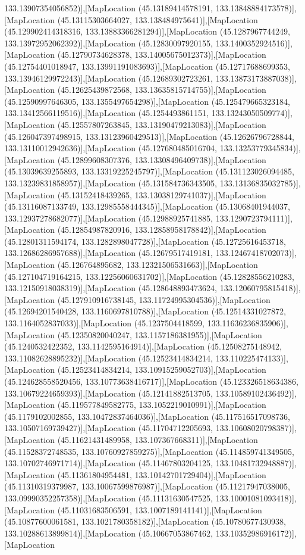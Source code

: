 133.13907354056852)],[MapLocation (45.13189414578191, 133.13848884173578)],[MapLocation (45.13115303664027, 133.138484975641)],[MapLocation (45.129902414318316, 133.13883366281294)],[MapLocation (45.1287967744249, 133.13972952062392)],[MapLocation (45.12830097920155, 133.1400352924516)],[MapLocation (45.12790734628378, 133.14005675012373)],[MapLocation (45.12754401018947, 133.13991191083693)],[MapLocation (45.12717688699353, 133.13946129972243)],[MapLocation (45.12689302723261, 133.13873173887038)],[MapLocation (45.12625439872568, 133.13635815714755)],[MapLocation (45.12590997646305, 133.1355497654298)],[MapLocation (45.125479665323184, 133.13412566119516)],[MapLocation (45.1254493861151, 133.13243050509774)],[MapLocation (45.12557807263845, 133.13190479213083)],[MapLocation (45.126047397498915, 133.13123960429513)],[MapLocation (45.12626796728844, 133.13110012942636)],[MapLocation (45.127680485016704, 133.13253779345834)],[MapLocation (45.12899608307376, 133.13308496409738)],[MapLocation (45.13039639255893, 133.13319225245797)],[MapLocation (45.131123026094485, 133.13239831858957)],[MapLocation (45.131584736343505, 133.13136835032785)],[MapLocation (45.13152418439265, 133.13038129741037)],[MapLocation (45.13116087133749, 133.12985558444345)],[MapLocation (45.13068401944037, 133.12937278682077)],[MapLocation (45.12988925741885, 133.1290723794111)],[MapLocation (45.12854987820916, 133.12858958178842)],[MapLocation (45.12801311594174, 133.1282898047728)],[MapLocation (45.12725616453718, 133.12686286957688)],[MapLocation (45.12679517419181, 133.12467418702073)],[MapLocation (45.126764895682, 133.12321506531663)],[MapLocation (45.127104719164215, 133.12256060631702)],[MapLocation (45.12828556210283, 133.12150918038319)],[MapLocation (45.128648893473624, 133.12060795815418)],[MapLocation (45.127910916738145, 133.11724995304536)],[MapLocation (45.12694201540428, 133.1160697810788)],[MapLocation (45.12514331027872, 133.1164052837033)],[MapLocation (45.1237504418599, 133.11636236835906)],[MapLocation (45.12350820040247, 133.1157186381955)],[MapLocation (45.1240532422352, 133.1142595164914)],[MapLocation (45.12508275148942, 133.11082628895232)],[MapLocation (45.12523414834214, 133.110225474133)],[MapLocation (45.12523414834214, 133.10915259052703)],[MapLocation (45.124628558520456, 133.10773638416717)],[MapLocation (45.123326518634386, 133.10679224659393)],[MapLocation (45.12141882513705, 133.10589102436492)],[MapLocation (45.119577849582775, 133.1052219010991)],[MapLocation (45.1179102002855, 133.10472837464036)],[MapLocation (45.117516517098736, 133.10507169739427)],[MapLocation (45.11704712205693, 133.10608020798387)],[MapLocation (45.11621431489958, 133.107367668311)],[MapLocation (45.11528372748535, 133.10760927859275)],[MapLocation (45.114859741349505, 133.10702746971714)],[MapLocation (45.11467803204125, 133.10481732948887)],[MapLocation (45.11361804954481, 133.10142701729404)],[MapLocation (45.11310319379987, 133.10067599876987)],[MapLocation (45.11217947038005, 133.09990352257358)],[MapLocation (45.11131630547525, 133.10001081093418)],[MapLocation (45.11031683506591, 133.1007189141141)],[MapLocation (45.10877600061581, 133.1021780358182)],[MapLocation (45.10780677430938, 133.10288613899814)],[MapLocation (45.10667053867462, 133.10352986916172)],[MapLocation 